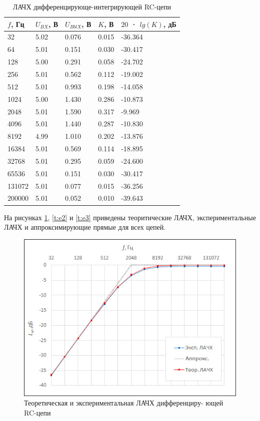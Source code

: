 \begin{table}[H]
	\begin{center}
	\caption{ЛАЧХ дифференцирующе-интегрирующей RC-цепи}
	\def\arraystretch{1.5}
		\begin{tabularx}{\textwidth}{|X|X|X|X|X|}
			\hline
			$f$, Гц & $U_{BX}$, В & $U_{BblX}$, В & $K$, В & $20$ · $lg(K)$, дБ\\\hline
			32 & 5.02 & 0.076 & 0.015 & -36.364\\\hline
			64 & 5.01 & 0.151 & 0.030 & -30.417\\\hline
			128 & 5.00 & 0.291 & 0.058 & -24.702\\\hline
			256 & 5.01 & 0.562 & 0.112 & -19.002\\\hline
			512 & 5.01 & 0.993 & 0.198 & -14.058\\\hline
			1024 & 5.00 & 1.430 & 0.286 & -10.873\\\hline
			2048 & 5.01 & 1.590 & 0.317 & -9.969\\\hline
			4096 & 5.01 & 1.440 & 0.287 & -10.830\\\hline
			8192 & 4.99 & 1.010 & 0.202 & -13.876\\\hline
			16384 & 5.01 & 0.569 & 0.114 & -18.895\\\hline
			32768 & 5.01 & 0.295 & 0.059 & -24.600\\\hline
			65536 & 5.01 & 0.151 & 0.030 & -30.417\\\hline
			131072 & 5.01 & 0.077 & 0.015 & -36.256\\\hline
			200000 & 5.01 & 0.052 & 0.010 & -39.643\\\hline		
		\end{tabularx}
		\label{tabular:3}
	\end{center}
\end{table}

На рисунках \ref{t:e1}, \ref{t:e2} и \ref{t:e3} приведены теоритические ЛАЧХ, экспериментальные ЛАЧХ и аппроксимирующие прямые для всех цепей.

\begin{figure}[H]
	\begin{center}
		\includegraphics[width=13cm]{1}
		\caption{Теоретическая и экспериментальная ЛАЧХ дифференциру-
ющей RC-цепи
} 
		\label{t:e1} %
	\end{center}
\end{figure}

